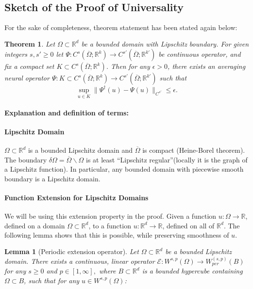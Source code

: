 \documentclass[reqno]{amsart}
\theoremstyle{plain}
\newtheorem{thm}{Theorem}
\newtheorem{lem}{Lemma}
\theoremstyle{definition}
\newcommand{\bb}[1]{\mathbb{#1}}
\newcommand{\cal}[1]{\mathcal{#1}}
\begin{document}
\subsection{Sketch of the Proof of Universality}
For the sake of completeness, theorem statement has been stated again below:
\begin{thm}
    Let $\Omega \subset \bb R^d$ be a bounded domain with Lipschitz boundary. For given integers $s,s' \geq 0$ let $\Psi : C^s(\overline{\Omega};\bb R^k) \to C^{s'}(\overline{\Omega};\bb R^{k'})$ be continuous operator, and fix a compact set $K \subset C^s(\overline{\Omega};\bb R^k)$. Then for any $\epsilon > 0$, there exists an averaging neural operator $\Psi : K \subset C^s(\overline{\Omega};\bb R^k) \to C^{s'}(\overline{\Omega};\bb R^{k'})$ such that 
    $$ \sup\limits_{u \in K}\|\Psi^\dag (u) - \Psi(u)\|_{C^{s'}} \leq \epsilon.$$ 
\end{thm}
\paragraph{\bf Explanation and definition of terms:}
\paragraph{\bf Lipschitz Domain}
$\Omega \subset \bb R^d$ is a bounded Lipschitz domain and $\overline{\Omega}$ is compact (Heine-Borel theorem). The boundary $\delta\Omega = \overline{\Omega}\backslash\Omega$ is at least ``Lipschitz regular''(locally it is the graph of a Lipschitz function). In particular, any bounded domain with piecewise smooth boundary is a Lipschitz domain.

\paragraph{\bf Function Extension for Lipschitz Domains}
We will be using this extension property in the proof. Given a function $u : \Omega \to \bb R$, defined on a domain $\Omega \subset \bb R^d$, to a function $u :\bb R^d \to \bb R$, defined on all of $\bb R^d$. The following lemma shows that this is possible, while preserving smoothness of $u$.
\begin{lem}[Periodic extension operator]
    Let $\Omega \subset \bb R^d$ be a bounded Lipschitz domain. There exists a continuous, linear operator $\cal E : W^{s,p}(\Omega) \to W_{per}^(s,p)(B)$ for any $s \geq 0$ and $p \in [1,\infty],$ where $B \subset \bb R^d$ is a bounded hypercube containing $\Omega \subset B$, such that for any $u \in W^{s,p}(\Omega)$:
\end{lem}


\end{document}
